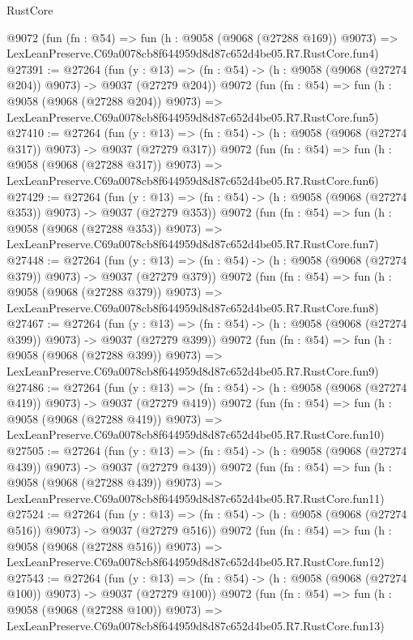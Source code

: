 \begin{lexlean}{RustCore}
\begin{coremodule}
    @9072
    (fun (fn : @54) =>
    fun (h : @9058 (@9068 (@27288 @169)) @9073) =>
    LexLeanPreserve.C69a0078cb8f644959d8d87c652d4be05.R7.RustCore.fun4)
@27391 := @27264
    (fun (y : @13) => (fn : @54) -> (h : @9058 (@9068 (@27274 @204)) @9073) -> @9037 (@27279 @204))
    @9072
    (fun (fn : @54) =>
    fun (h : @9058 (@9068 (@27288 @204)) @9073) =>
    LexLeanPreserve.C69a0078cb8f644959d8d87c652d4be05.R7.RustCore.fun5)
@27410 := @27264
    (fun (y : @13) => (fn : @54) -> (h : @9058 (@9068 (@27274 @317)) @9073) -> @9037 (@27279 @317))
    @9072
    (fun (fn : @54) =>
    fun (h : @9058 (@9068 (@27288 @317)) @9073) =>
    LexLeanPreserve.C69a0078cb8f644959d8d87c652d4be05.R7.RustCore.fun6)
@27429 := @27264
    (fun (y : @13) => (fn : @54) -> (h : @9058 (@9068 (@27274 @353)) @9073) -> @9037 (@27279 @353))
    @9072
    (fun (fn : @54) =>
    fun (h : @9058 (@9068 (@27288 @353)) @9073) =>
    LexLeanPreserve.C69a0078cb8f644959d8d87c652d4be05.R7.RustCore.fun7)
@27448 := @27264
    (fun (y : @13) => (fn : @54) -> (h : @9058 (@9068 (@27274 @379)) @9073) -> @9037 (@27279 @379))
    @9072
    (fun (fn : @54) =>
    fun (h : @9058 (@9068 (@27288 @379)) @9073) =>
    LexLeanPreserve.C69a0078cb8f644959d8d87c652d4be05.R7.RustCore.fun8)
@27467 := @27264
    (fun (y : @13) => (fn : @54) -> (h : @9058 (@9068 (@27274 @399)) @9073) -> @9037 (@27279 @399))
    @9072
    (fun (fn : @54) =>
    fun (h : @9058 (@9068 (@27288 @399)) @9073) =>
    LexLeanPreserve.C69a0078cb8f644959d8d87c652d4be05.R7.RustCore.fun9)
@27486 := @27264
    (fun (y : @13) => (fn : @54) -> (h : @9058 (@9068 (@27274 @419)) @9073) -> @9037 (@27279 @419))
    @9072
    (fun (fn : @54) =>
    fun (h : @9058 (@9068 (@27288 @419)) @9073) =>
    LexLeanPreserve.C69a0078cb8f644959d8d87c652d4be05.R7.RustCore.fun10)
@27505 := @27264
    (fun (y : @13) => (fn : @54) -> (h : @9058 (@9068 (@27274 @439)) @9073) -> @9037 (@27279 @439))
    @9072
    (fun (fn : @54) =>
    fun (h : @9058 (@9068 (@27288 @439)) @9073) =>
    LexLeanPreserve.C69a0078cb8f644959d8d87c652d4be05.R7.RustCore.fun11)
@27524 := @27264
    (fun (y : @13) => (fn : @54) -> (h : @9058 (@9068 (@27274 @516)) @9073) -> @9037 (@27279 @516))
    @9072
    (fun (fn : @54) =>
    fun (h : @9058 (@9068 (@27288 @516)) @9073) =>
    LexLeanPreserve.C69a0078cb8f644959d8d87c652d4be05.R7.RustCore.fun12)
@27543 := @27264
    (fun (y : @13) => (fn : @54) -> (h : @9058 (@9068 (@27274 @100)) @9073) -> @9037 (@27279 @100))
    @9072
    (fun (fn : @54) =>
    fun (h : @9058 (@9068 (@27288 @100)) @9073) =>
    LexLeanPreserve.C69a0078cb8f644959d8d87c652d4be05.R7.RustCore.fun13)

\end{coremodule}
\end{lexlean}
